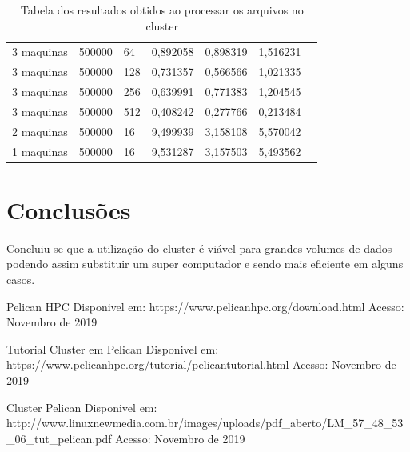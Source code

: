 \documentclass[12pt]{article}
\begin{document}
\begin{table}[]
\begin{tabular}{l|llllll}
3 maquinas & 500000     & 64              & 0,892058            & 0,898319          & 1,516231   &            \\
3 maquinas & 500000     & 128             & 0,731357            & 0,566566          & 1,021335   &            \\
3 maquinas & 500000     & 256             & 0,639991            & 0,771383          & 1,204545   &            \\
3 maquinas & 500000     & 512             & 0,408242            & 0,277766          & 0,213484   &            \\
2 maquinas & 500000          & 16                  & 9,499939          & 3,158108   & 5,570042   \\
1 maquinas & 500000          & 16                  & 9,531287          & 3,157503   & 5,493562  
\end{tabular}
\caption{Tabela dos resultados obtidos ao processar os arquivos no cluster}
\label{tab:table-result-cluster}
\end{table}
\section{Conclusões}
Concluiu-se que a utilização do cluster é viável para grandes volumes de dados 
podendo assim substituir um super computador e sendo mais eficiente em alguns casos. 





Pelican HPC Disponivel em: https://www.pelicanhpc.org/download.html 
Acesso: Novembro de 2019

Tutorial Cluster em Pelican Disponivel em: https://www.pelicanhpc.org/tutorial/pelicantutorial.html 
Acesso: Novembro de 2019

Cluster Pelican Disponivel em: http://www.linuxnewmedia.com.br/images/uploads/pdf_aberto/LM_57_48_53_06_tut_pelican.pdf 
Acesso: Novembro de 2019
\end{document}
